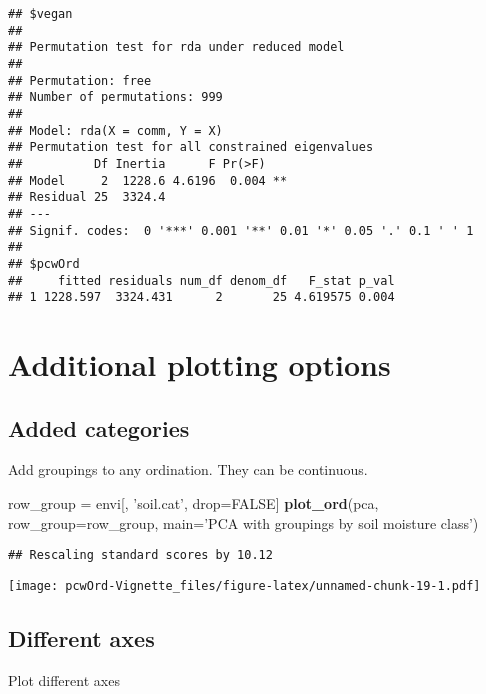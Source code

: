 \documentclass[
]{article}
\newenvironment{Shaded}{\begin{snugshade}}{\end{snugshade}}
\newcommand{\DataTypeTok}[1]{\textcolor[rgb]{0.13,0.29,0.53}{#1}}
\newcommand{\KeywordTok}[1]{\textcolor[rgb]{0.13,0.29,0.53}{\textbf{#1}}}
\newcommand{\NormalTok}[1]{#1}
\newcommand{\OtherTok}[1]{\textcolor[rgb]{0.56,0.35,0.01}{#1}}
\newcommand{\StringTok}[1]{\textcolor[rgb]{0.31,0.60,0.02}{#1}}
\begin{document}
\begin{verbatim}
## $vegan
## 
## Permutation test for rda under reduced model 
## 
## Permutation: free
## Number of permutations: 999
##  
## Model: rda(X = comm, Y = X)
## Permutation test for all constrained eigenvalues
##          Df Inertia      F Pr(>F)   
## Model     2  1228.6 4.6196  0.004 **
## Residual 25  3324.4                 
## ---
## Signif. codes:  0 '***' 0.001 '**' 0.01 '*' 0.05 '.' 0.1 ' ' 1
## 
## $pcwOrd
##     fitted residuals num_df denom_df   F_stat p_val
## 1 1228.597  3324.431      2       25 4.619575 0.004
\end{verbatim}

\hypertarget{additional-plotting-options}{%
\section{Additional plotting
options}\label{additional-plotting-options}}

\hypertarget{added-categories}{%
\subsection{Added categories}\label{added-categories}}

Add groupings to any ordination. They can be continuous.

\begin{Shaded}
\begin{Highlighting}[]
\NormalTok{row_group =}\StringTok{ }\NormalTok{envi[, }\StringTok{'soil.cat'}\NormalTok{, drop=}\OtherTok{FALSE}\NormalTok{]}
\KeywordTok{plot_ord}\NormalTok{(pca, }
         \DataTypeTok{row_group=}\NormalTok{row_group, }
         \DataTypeTok{main=}\StringTok{'PCA with groupings by soil moisture class'}\NormalTok{)}
\end{Highlighting}
\end{Shaded}

\begin{verbatim}
## Rescaling standard scores by 10.12
\end{verbatim}

\texttt{[image: pcwOrd-Vignette\_files/figure-latex/unnamed-chunk-19-1.pdf]}

\hypertarget{different-axes}{%
\subsection{Different axes}\label{different-axes}}

Plot different axes
\end{document}
